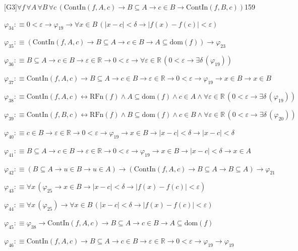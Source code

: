\begin{fullproof}{[G3]}{$\forall f\,\forall A\,\forall B\,\forall c\,(\mathrm{ContIn}(f,A,c) \to B \subseteq A \to c \in B \to \mathrm{ContIn}(f,B,c))$}{159}
\begin{abbrevlist}
\item $\varphi_{34} :\equiv 0 < \varepsilon \to \varphi_{19} \to \forall x \in B\,(\lvert x - c \rvert < \delta \to \lvert f(x) - f(c) \rvert < \varepsilon)$
\item $\varphi_{35} :\equiv (\mathrm{ContIn}(f,A,c) \to B \subseteq A \to c \in B \to A \subseteq \mathrm{dom}(f)) \to \varphi_{23}$
\item $\varphi_{36} :\equiv B \subseteq A \to c \in B \to \varepsilon \in \mathbb{R} \to 0 < \varepsilon \to \forall \varepsilon \in \mathbb{R}\,(0 < \varepsilon \to \exists \delta\,(\varphi_{19}))$
\item $\varphi_{37} :\equiv \mathrm{ContIn}(f,A,c) \to B \subseteq A \to c \in B \to \varepsilon \in \mathbb{R} \to 0 < \varepsilon \to \varphi_{19} \to x \in B \to x \in B$
\item $\varphi_{38} :\equiv \mathrm{ContIn}(f,A,c) \leftrightarrow \mathrm{RFn}(f) \land A \subseteq \mathrm{dom}(f) \land c \in A \land \forall \varepsilon \in \mathbb{R}\,(0 < \varepsilon \to \exists \delta\,(\varphi_{19}))$
\item $\varphi_{39} :\equiv \mathrm{ContIn}(f,B,c) \leftrightarrow \mathrm{RFn}(f) \land B \subseteq \mathrm{dom}(f) \land c \in B \land \forall \varepsilon \in \mathbb{R}\,(0 < \varepsilon \to \exists \delta\,(\varphi_{20}))$
\item $\varphi_{40} :\equiv c \in B \to \varepsilon \in \mathbb{R} \to 0 < \varepsilon \to \varphi_{19} \to x \in B \to \lvert x - c \rvert < \delta \to \lvert x - c \rvert < \delta$
\item $\varphi_{41} :\equiv B \subseteq A \to c \in B \to \varepsilon \in \mathbb{R} \to 0 < \varepsilon \to \varphi_{19} \to x \in B \to \lvert x - c \rvert < \delta \to x \in A$
\item $\varphi_{42} :\equiv (B \subseteq A \to u \in B \to u \in A) \to (\mathrm{ContIn}(f,A,c) \to B \subseteq A \to B \subseteq A) \to \varphi_{21}$
\item $\varphi_{43} :\equiv \forall x\,(\varphi_{25} \to x \in B \to \lvert x - c \rvert < \delta \to \lvert f(x) - f(c) \rvert < \varepsilon)$
\item $\varphi_{44} :\equiv \forall x\,(\varphi_{25}) \to \forall x \in B\,(\lvert x - c \rvert < \delta \to \lvert f(x) - f(c) \rvert < \varepsilon)$
\item $\varphi_{45} :\equiv \varphi_{38} \to \mathrm{ContIn}(f,A,c) \to B \subseteq A \to c \in B \to A \subseteq \mathrm{dom}(f)$
\item $\varphi_{46} :\equiv \mathrm{ContIn}(f,A,c) \to B \subseteq A \to c \in B \to \varepsilon \in \mathbb{R} \to 0 < \varepsilon \to \varphi_{19} \to \varphi_{19}$

\end{abbrevlist}
\end{fullproof}
